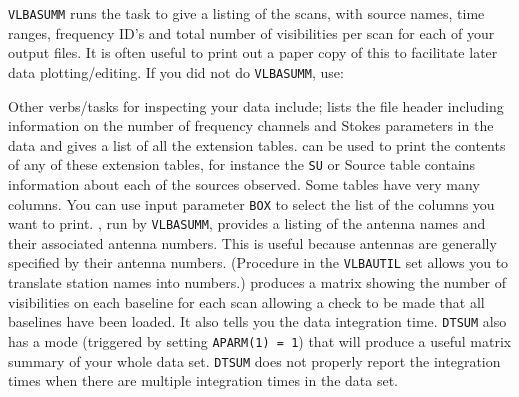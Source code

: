 {\tt VLBASUMM} runs the task {\tt {}} to give a listing of
the scans, with source names, time ranges, frequency ID's and total
number of visibilities per scan for each of your output files.  It is
often useful to print out a paper copy of this to facilitate later
data plotting/editing.  If you did not do {\tt VLBASUMM},
use:

Other verbs/tasks for inspecting your data include;
\xben
{} lists the file header including
    information on the number of frequency channels and Stokes
    parameters in the data and gives a list of all the extension
    tables.
 can be used to print the contents of any of
    these extension tables, for instance the {\tt SU} or Source table
    contains information about each of the sources observed.  Some
    tables have very many columns. You can use input parameter
    {\tt BOX} to select the list of the columns you want to print.
, run by {\tt VLBASUMM}, provides a listing of
    the antenna names and their associated antenna numbers.  This is
    useful because antennas are generally specified by their antenna
    numbers.  (Procedure {\tt {}} in the {\tt VLBAUTIL} set
    allows you to translate station names into numbers.)
 produces a matrix showing the number
    of visibilities on each baseline for each scan allowing a check to
    be made that all baselines have been loaded.  It also tells you
    the data integration time.  {\tt DTSUM} also has a mode (triggered
    by setting {\tt APARM(1) = 1}) that will produce a useful matrix
    summary of your whole data set.  {\tt DTSUM} does not properly
    report the integration times when there are multiple integration
    times in the data set.
\xeen

